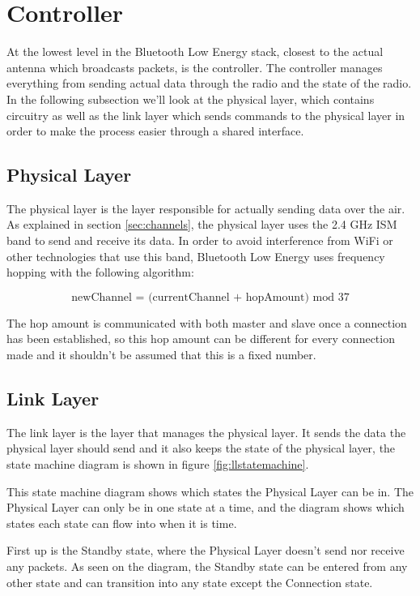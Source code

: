 \documentclass[pdftex,a4paper,12pt,twoside]{report}
\begin{document}
\newpage{}

\section{Controller}
\label{sec:stackController}
At the lowest level in the Bluetooth Low Energy stack, closest to the actual antenna which broadcasts packets, is the controller. The controller manages everything from sending actual data through the radio and the state of the radio. In the following subsection we'll look at the physical layer, which contains circuitry as well as the link layer which sends commands to the physical layer in order to make the process easier through a shared interface.

\subsection{Physical Layer}
\label{subsec:controllerPHY}
The physical layer is the layer responsible for actually sending data over the air. As explained in section \ref{sec:channels}, the physical layer uses the 2.4 GHz ISM band to send and receive its data. In order to avoid interference from WiFi or other technologies that use this band, Bluetooth Low Energy uses frequency hopping with the following algorithm:

\begin{equation*}
\text{newChannel = (currentChannel + hopAmount) mod 37}
\end{equation*}

The hop amount is communicated with both master and slave once a connection has been established, so this hop amount can be different for every connection made and it shouldn't be assumed that this is a fixed number.

\subsection{Link Layer}
\label{subsec:controllerLL}
The link layer is the layer that manages the physical layer. It sends the data the physical layer should send and it also keeps the state of the physical layer, the state machine diagram is shown in figure \ref{fig:llstatemachine}. 

This state machine diagram shows which states the Physical Layer can be in. The Physical Layer can only be in one state at a time, and the diagram shows which states each state can flow into when it is time.

First up is the Standby state, where the Physical Layer doesn't send nor receive any packets. As seen on the diagram, the Standby state can be entered from any other state and can transition into any state except the Connection state.
\end{document}
